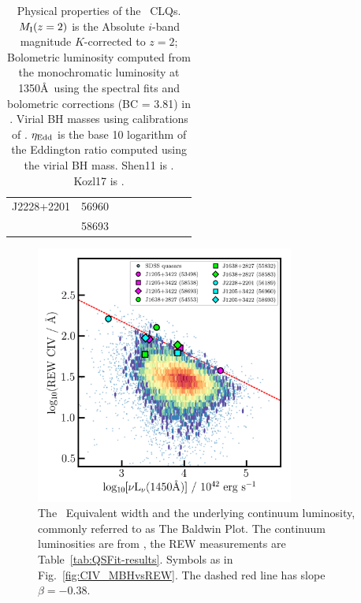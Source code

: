 \documentclass[fleqn,usenatbib]{mnras}
\begin{document}
\begin{table}
\begin{tabular}{l l  ll ll cc r}
    J2228+2201       & 56960                          &                                       &                                                &                              &                               &                 &                                        & \\
                              & 58693                          &                                       &                                               &                               &                                &                &                   &  \\
     \hline
    \hline
  \end{tabular}
  \caption{Physical properties of the \civ\ CLQs. 
     $M_{\rm I}(z=2)$ is the Absolute $i$-band magnitude $K$-corrected to $z = 2$; Bolometric luminosity computed from the
        monochromatic luminosity at 1350\AA\ using the spectral fits and
        bolometric corrections (BC = 3.81) in \citet{Richards2006b}.
        Virial BH masses using calibrations of \citet{VestergaardPeterson2006}.
         $\eta_{\rm Edd}$ is the base 10 logarithm of the Eddington ratio computed using the virial BH mass.
        Shen11 is \citet{Shen2011}. 
        Kozl17 is \citet{Kozlowski2017}. }
\label{tab:Eddington_ratios} 
\end{table}

\begin{figure}
  \centering
  \includegraphics[width=8.5cm, trim=0.2cm 0.2cm 0.0cm 0.2cm, clip]
  {figures/CIV_CLQs_Baldwin_20191130.png}
   \vspace{-12pt}
   \caption[]{The \civ\ Equivalent width and the underlying continuum luminosity,
     commonly referred to as The Baldwin Plot.
     The continuum luminosities are  from \citet{Calderone2017},
     the REW measurements are Table~\ref{tab:QSFit-results}.
     Symbols as in Fig.~\ref{fig:CIV_MBHvsREW}.
     The dashed red line has slope $\beta=-0.38$.}
  \label{fig:CIV_Baldwin}
\end{figure}
\end{document}

